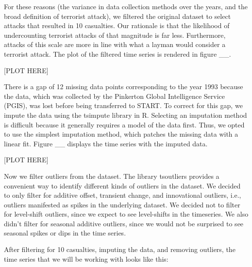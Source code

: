 \documentclass[font=12pt]{paper}
\begin{document}
For these reasons (the variance in data collection methods over the years, and the broad definition of terrorist attack), we filtered the original dataset to select attacks that resulted in 10 casualties. Our rationale is that the likelihood of undercounting terrorist attacks of that magnitude is far less. Furthermore, attacks of this scale are more in line with what a layman would consider a terrorist attack. The plot of the filtered time series is rendered in figure __.

[PLOT HERE]


There is a gap of 12 missing data points corresponding to the year 1993 because the data, which was collected by the Pinkerton Global Intelligence Service (PGIS), was lost before being transferred to START. To correct for this gap, we impute the data using the tsimpute library in R. Selecting an imputation method is difficult because it generally requires a model of the data first. Thus, we opted to use the simplest imputation method, which patches the missing data with a linear fit. Figure __ displays the time series with the imputed data.

[PLOT HERE]



Now we filter outliers from the dataset. The library tsoutliers provides a convenient way to identify different kinds of outliers in the dataset. We decided to only filter for additive offset, transient change, and innovational outliers, i.e., outliers manifested as spikes in the underlying dataset. We decided not to filter for level-shift outliers, since we expect to see level-shifts in the timeseries. We also didn’t filter for seasonal additive outliers, since we would not be surprised to see seasonal spikes or dips in the time series.

After filtering for 10 casualties, imputing the data, and removing outliers, the time series that we will be working with looks like this:
\end{document}
